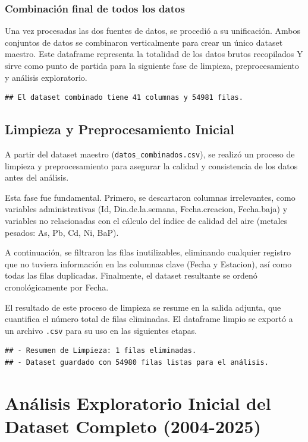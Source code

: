 \documentclass[,,,moreauthors,pdftex]{Definitions/mdpi}
\begin{document}
\subsubsection{Combinación final de todos los
datos}\label{combinaciuxf3n-final-de-todos-los-datos}

Una vez procesadas las dos fuentes de datos, se procedió a su
unificación. Ambos conjuntos de datos se combinaron verticalmente para
crear un único dataset maestro. Este dataframe representa la totalidad
de los datos brutos recopilados Y sirve como punto de partida para la
siguiente fase de limpieza, preprocesamiento y análisis exploratorio.

\begin{verbatim}
## El dataset combinado tiene 41 columnas y 54981 filas.
\end{verbatim}

\subsection{Limpieza y Preprocesamiento
Inicial}\label{limpieza-y-preprocesamiento-inicial}

A partir del dataset maestro (\texttt{datos\_combinados.csv}), se
realizó un proceso de limpieza y preprocesamiento para asegurar la
calidad y consistencia de los datos antes del análisis.

Esta fase fue fundamental. Primero, se descartaron columnas
irrelevantes, como variables administrativas (Id, Dia.de.la.semana,
Fecha.creacion, Fecha.baja) y variables no relacionadas con el cálculo
del índice de calidad del aire (metales pesados: As, Pb, Cd, Ni, BaP).

A continuación, se filtraron las filas inutilizables, eliminando
cualquier registro que no tuviera información en las columnas clave
(Fecha y Estacion), así como todas las filas duplicadas. Finalmente, el
dataset resultante se ordenó cronológicamente por Fecha.

El resultado de este proceso de limpieza se resume en la salida adjunta,
que cuantifica el número total de filas eliminadas. El dataframe limpio
se exportó a un archivo \texttt{.csv} para su uso en las siguientes
etapas.

\begin{verbatim}
## - Resumen de Limpieza: 1 filas eliminadas. 
## - Dataset guardado con 54980 filas listas para el análisis.
\end{verbatim}

\section{Análisis Exploratorio Inicial del Dataset Completo
(2004-2025)}\label{anuxe1lisis-exploratorio-inicial-del-dataset-completo-2004-2025}
\end{document}
